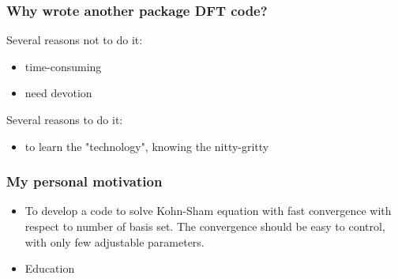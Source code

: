 \documentclass{beamer}
\begin{document}
\begin{frame}
\frametitle{Why wrote another package DFT code?}

Several reasons not to do it:

\begin{itemize}
\item time-consuming
\item need devotion
\end{itemize}

Several reasons to do it:

\begin{itemize}
\item to learn the "technology", knowing the nitty-gritty
\end{itemize}

\end{frame}


\begin{frame}
\frametitle{My personal motivation}

\begin{itemize}
\item To develop a code to solve Kohn-Sham equation with fast convergence with
respect to number of basis set. The convergence should be easy to control,
with only few adjustable parameters.
\item Education
\end{itemize}


\end{frame}
\end{document}
